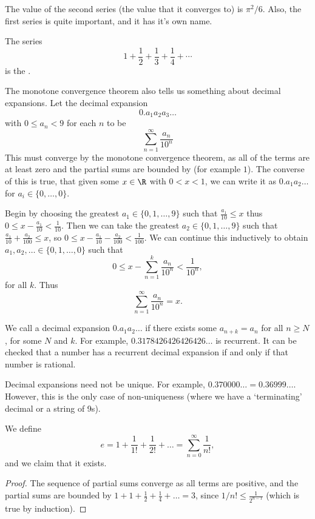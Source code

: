 \documentclass[a4paper]{scrreprt}
\begin{document}
The value of the second series (the value that it converges to) is $\pi^2 / 6$. Also, the first series is quite important, and it has it's own name.

\begin{definition}
The series
$$
1 + \frac{1}{2} + \frac{1}{3} + \frac{1}{4} + \cdots
$$
is the .
\end{definition}

The monotone convergence theorem also tells us something about decimal expansions. Let the decimal expansion
$$
0.a_1 a_2 a_3 \dots
$$
with $0 \leq a_n < 9$ for each $n$ to be 
$$
\sum_{n = 1}^\infty \frac{a_n}{10^n}
$$
This must converge by the monotone convergence theorem, as all of the terms are at least zero and the partial sums are bounded by (for example $1$).
The converse of this is true, that given some $x \in \R$ with $0 < x < 1$, we can write it as $0.a_1 a_2 \dots$ for $a_i \in \{0, \dots, 0\}$.

Begin by choosing the greatest $a_1 \in \{0, 1, \dots, 9\}$ such that
$
\frac{a_1}{10}\leq x
$
thus $0 \leq x - \frac{a_1}{10} < \frac{1}{10}$. Then we can take the greatest $a_2 \in \{0, 1, \dots, 9\}$ such that $\frac{a_1}{10} + \frac{a_2}{100} \leq x$, so $0 \leq x - \frac{a_1}{10} - \frac{a_2}{100} < \frac{1}{100}$. We can continue this inductively to obtain $a_1, a_2, \dots \in \{0, 1, \dots, 0\}$ such that
$$
0 \leq x - \sum_{n = 1}^k \frac{a_n}{10^n} < \frac{1}{10^n},
$$
for all $k$. Thus
$$
\sum_{n = 1}^{\infty} \frac{a_n}{10^n} = x.
$$

\begin{remark}
	We call a decimal expansion $0.a_1 a_2 \dots$  if there exists some $a_{n + k} = a_n$ for all $n \geq N$, for some $N$ and $k$. For example, $0.3178426426426426\dots$ is recurrent. It can be checked that a number has a recurrent decimal expansion if and only if that number is rational. 
\end{remark}
\begin{remark}
	Decimal expansions need not be unique. For example, $0.370000\dots = 0.36999\dots$. However, this is the only case of non-uniqueness (where we have a `terminating' decimal or a string of 9s).
\end{remark}

\begin{theorem}[$e$ Exists]
	We define
	$$
	e = 1 + \frac{1}{1!} + \frac{1}{2!} + \dots = \sum_{n = 0}^\infty \frac{1}{n!},
	$$
	and we claim that it exists.
\end{theorem}
\begin{proof}
	The sequence of partial sums converge as all terms are positive, and the partial sums are bounded by $1 + 1 + \frac{1}{2} + \frac{1}{4} + \dots = 3$, since $1/n! \leq \frac{1}{2^{n - 1}}$ (which is true by induction).
\end{proof}
\end{document}

